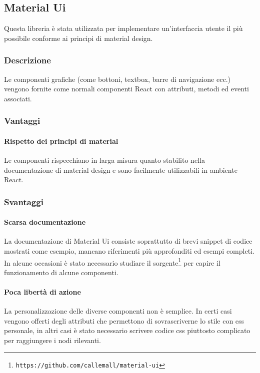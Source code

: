 \subsection{Material Ui}\label{material-ui}

Questa libreria è stata utilizzata per implementare un'interfaccia utente il più
possibile conforme ai principi di material design.

\subsubsection{Descrizione}
Le componenti grafiche (come bottoni, textbox, barre di navigazione ecc.) vengono
fornite come normali componenti React con attributi, metodi ed eventi associati.

\subsubsection{Vantaggi}

\paragraph{Rispetto dei principi di material}
Le componenti rispecchiano in larga
misura quanto stabilito nella documentazione di material design e sono facilmente 
utilizzabili in ambiente React.

\subsubsection{Svantaggi}\label{svantaggi-material-ui}

\paragraph{Scarsa documentazione}
La documentazione di Material Ui consiste soprattutto
di brevi snippet di codice mostrati come esempio, mancano riferimenti più approfonditi ed
esempi completi. In alcune occasioni è stato necessario studiare il sorgente\footnote{\texttt{https://github.com/callemall/material-ui}} per capire il
funzionamento di alcune componenti.

\paragraph{Poca libertà di azione}
La personalizzazione delle diverse componenti non è
semplice. In certi casi vengono offerti degli attributi che permettono di sovrascriverne
lo stile con css personale, in altri casi è stato necessario scrivere codice css piuttosto
complicato per raggiungere i nodi rilevanti.

